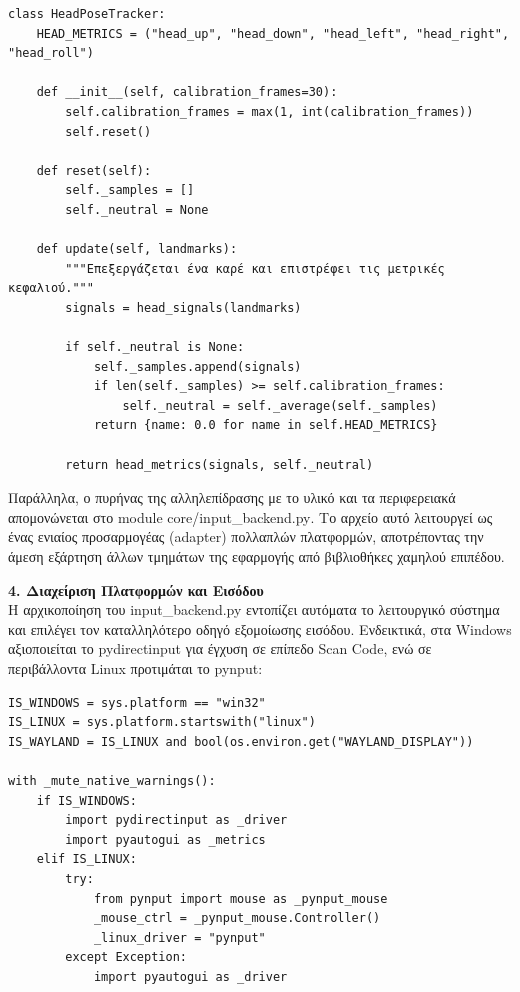 \documentclass[twoside, a4paper, 11pt]{article}
\newcommand{\textlatin}[1]{\textenglish{#1}}
\begin{document}
\begin{verbatim}
class HeadPoseTracker:
    HEAD_METRICS = ("head_up", "head_down", "head_left", "head_right", "head_roll")

    def __init__(self, calibration_frames=30):
        self.calibration_frames = max(1, int(calibration_frames))
        self.reset()

    def reset(self):
        self._samples = []
        self._neutral = None

    def update(self, landmarks):
        """Επεξεργάζεται ένα καρέ και επιστρέφει τις μετρικές κεφαλιού."""
        signals = head_signals(landmarks)

        if self._neutral is None:
            self._samples.append(signals)
            if len(self._samples) >= self.calibration_frames:
                self._neutral = self._average(self._samples)
            return {name: 0.0 for name in self.HEAD_METRICS}

        return head_metrics(signals, self._neutral)
\end{verbatim}

Παράλληλα, ο πυρήνας της αλληλεπίδρασης με το υλικό και τα περιφερειακά απομονώνεται στο module \textlatin{core/input\_backend.py}. Το αρχείο αυτό λειτουργεί ως ένας ενιαίος προσαρμογέας (\textlatin{adapter}) πολλαπλών πλατφορμών, αποτρέποντας την άμεση εξάρτηση άλλων τμημάτων της εφαρμογής από βιβλιοθήκες χαμηλού επιπέδου.

\textbf{4. Διαχείριση Πλατφορμών και Εισόδου}\\
Η αρχικοποίηση του \textlatin{input\_backend.py} εντοπίζει αυτόματα το λειτουργικό σύστημα και επιλέγει τον καταλληλότερο οδηγό εξομοίωσης εισόδου. Ενδεικτικά, στα Windows αξιοποιείται το \textlatin{pydirectinput} για έγχυση σε επίπεδο \textlatin{Scan Code}, ενώ σε περιβάλλοντα Linux προτιμάται το \textlatin{pynput}:

\begin{verbatim}
IS_WINDOWS = sys.platform == "win32"
IS_LINUX = sys.platform.startswith("linux")
IS_WAYLAND = IS_LINUX and bool(os.environ.get("WAYLAND_DISPLAY"))

with _mute_native_warnings():
    if IS_WINDOWS:
        import pydirectinput as _driver
        import pyautogui as _metrics
    elif IS_LINUX:
        try:
            from pynput import mouse as _pynput_mouse
            _mouse_ctrl = _pynput_mouse.Controller()
            _linux_driver = "pynput"
        except Exception:
            import pyautogui as _driver
\end{verbatim}
\end{document}
